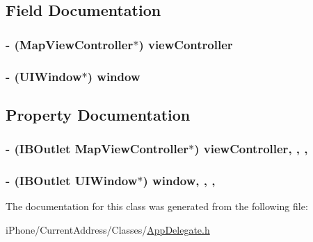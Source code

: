 \subsection{Field Documentation}
\hypertarget{interface_app_delegate_aa22afbe0037987ac2757d6a5e84efd13}{
\subsubsection[{view\-Controller}]{\setlength{\rightskip}{0pt plus 5cm}-\/ ({\bf Map\-View\-Controller}$\ast$) view\-Controller\hspace{0.3cm}{\ttfamily [protected]}}}\label{interface_app_delegate_aa22afbe0037987ac2757d6a5e84efd13}
\hypertarget{interface_app_delegate_ae04748cdefebda525b266731b6c120a2}{
\subsubsection[{window}]{\setlength{\rightskip}{0pt plus 5cm}-\/ (U\-I\-Window$\ast$) window\hspace{0.3cm}{\ttfamily [protected]}}}\label{interface_app_delegate_ae04748cdefebda525b266731b6c120a2}


\subsection{Property Documentation}
\hypertarget{interface_app_delegate_a5b5475af5a71e801e164575948f11239}{
\subsubsection[{view\-Controller}]{\setlength{\rightskip}{0pt plus 5cm}-\/ (I\-B\-Outlet {\bf Map\-View\-Controller}$\ast$) view\-Controller\hspace{0.3cm}{\ttfamily [read]}, {\ttfamily [write]}, {\ttfamily [nonatomic]}, {\ttfamily [retain]}}}\label{interface_app_delegate_a5b5475af5a71e801e164575948f11239}
\hypertarget{interface_app_delegate_a055d472434a4ee0b915c207957a400e1}{
\subsubsection[{window}]{\setlength{\rightskip}{0pt plus 5cm}-\/ (I\-B\-Outlet U\-I\-Window$\ast$) window\hspace{0.3cm}{\ttfamily [read]}, {\ttfamily [write]}, {\ttfamily [nonatomic]}, {\ttfamily [retain]}}}\label{interface_app_delegate_a055d472434a4ee0b915c207957a400e1}


The documentation for this class was generated from the following file\-:\begin{DoxyCompactItemize}
\item 
i\-Phone/\-Current\-Address/\-Classes/\hyperlink{_app_delegate_8h}{App\-Delegate.\-h}\end{DoxyCompactItemize}
